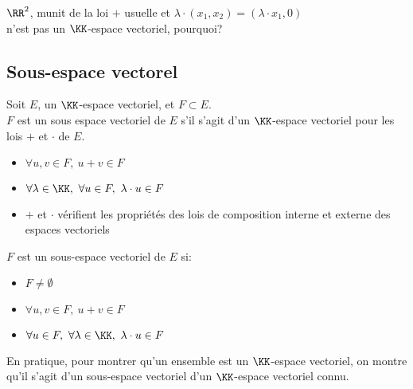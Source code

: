 \documentclass[../main.tex]{subfile}
\begin{document}
\begin{rema}
	$\RR^2$, munit de la loi $+$ usuelle et $\lambda \cdot (x_1, x_2) = (\lambda \cdot x_1, 0)$\\
	n'est pas un $\KK$-espace vectoriel, pourquoi?
\end{rema}

\subsection{Sous-espace vectorel}

\begin{defi}
	Soit $E$, un $\KK$-espace vectoriel, et $F \subset E$.\\
	$F$ est un sous espace vectoriel de $E$ s'il s'agit d'un $\KK$-espace vectoriel pour les lois $+$ et $\cdot$ de $E$.
\begin{itemize}
	\item $\forall u, v \in F, \ u + v \in F$
	\item $\forall \lambda \in \KK, \ \forall u \in F, \ \lambda \cdot u \in F$
	\item $+$ et $\cdot$ vérifient les propriétés des lois de composition interne et externe des espaces vectoriels
\end{itemize}
\end{defi}

\begin{prop}
	$F$ est un sous-espace vectoriel de $E$ si:
\begin{itemize}
	\item $F \neq \emptyset$
	\item $\forall u, v \in F, \ u+v \in F$
	\item $\forall u \in F, \ \forall \lambda \in \KK, \ \lambda \cdot u \in F$
\end{itemize}
\end{prop}

En pratique, pour montrer qu'un ensemble est un $\KK$-espace vectoriel, on montre qu'il s'agit d'un sous-espace vectoriel d'un $\KK$-espace vectoriel connu.
\end{document}
